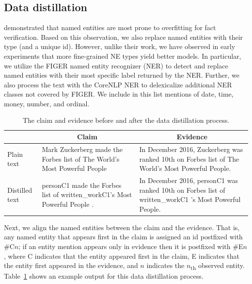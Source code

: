 \subsection{Data distillation}

\citet{suntwal-etal-2019-importance} demonstrated that named entities are most prone to overfitting for fact verification.
Based on this observation, we also replace named entities with their type (and a unique id).
However, unlike their work, we have observed in early experiments that more fine-grained NE types yield better models. In particular, we utilize the FIGER  named entity recognizer (NER) \citep{ling2012fine} to detect and replace named entities with their most specific label returned by the NER. Further, we also process the text with the CoreNLP NER \citep{manning2014stanford} to delexicalize additional NER classes not covered by FIGER. We include in this list mentions of date, time, money, number, and ordinal.


\begin{table}[h]
\footnotesize
\begin{tabular}{p{10mm}p{26mm}p{30mm} }
\toprule
& \multicolumn{1}{c}{Claim} & \multicolumn{1}{c}{Evidence} \\
\midrule
\vspace{2mm}Plain text & \vspace{.1mm}Mark Zuckerberg made the Forbes list of The World's Most Powerful People  & In December 2016, Zuckerberg was ranked 10th on Forbes list of The World's Most Powerful People. \\
\midrule
\vspace{2mm}Distilled text & \vspace{.1mm}personC1 made the Forbes list of written\_workC1's Most Powerful People .   & In December 2016, personC1 was ranked 10th on Forbes list of written\_workC1 's Most Powerful People.  \\
\bottomrule
\end{tabular}
\caption{  The claim and evidence before and after the data distillation process.}
\label{distillation_examples}
\end{table}


Next, we align the named entities between the claim and the evidence. That is, any named entity that appears first in the claim is assigned an id postfixed with \#C$n$; if an entity mention appears only in evidence then it is postfixed with \#E$n$, where C indicates that the entity appeared first in the claim, E indicates that the entity first appeared in the evidence, and $n$ indicates the $n$\textsubscript{th} observed entity. Table~\ref{distillation_examples} shows an example output for this data distillation process.

